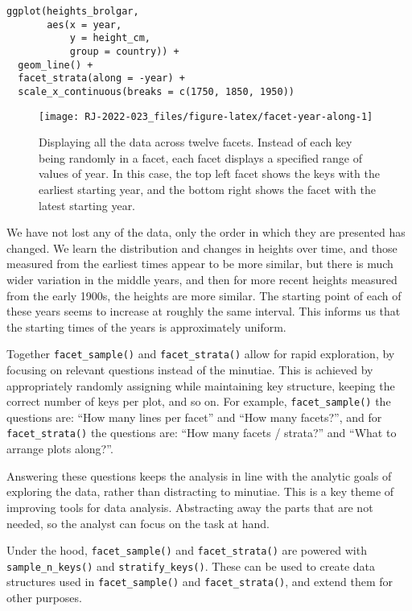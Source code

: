 \begin{verbatim}
ggplot(heights_brolgar,
       aes(x = year,
           y = height_cm,
           group = country)) + 
  geom_line() + 
  facet_strata(along = -year) + 
  scale_x_continuous(breaks = c(1750, 1850, 1950))
\end{verbatim}

\begin{figure}

{\centering \texttt{[image: RJ-2022-023\_files/figure-latex/facet-year-along-1]} 

}

\caption{Displaying all the data across twelve facets. Instead of each key being randomly in a facet, each facet displays a specified range of values of year. In this case, the top left facet shows the keys with the earliest starting year, and the bottom right shows the facet with the latest starting year.}\label{fig:facet-year-along}
\end{figure}

We have not lost any of the data, only the order in which they are presented has changed. We learn the distribution and changes in heights over time, and those measured from the earliest times appear to be more similar, but there is much wider variation in the middle years, and then for more recent heights measured from the early 1900s, the heights are more similar. The starting point of each of these years seems to increase at roughly the same interval. This informs us that the starting times of the years is approximately uniform.

Together \texttt{facet\_sample()} and \texttt{facet\_strata()} allow for rapid exploration, by focusing on relevant questions instead of the minutiae. This is achieved by appropriately randomly assigning while maintaining key structure, keeping the correct number of keys per plot, and so on. For example, \texttt{facet\_sample()} the questions are: ``How many lines per facet'' and ``How many facets?'', and for \texttt{facet\_strata()} the questions are: ``How many facets / strata?'' and ``What to arrange plots along?''.

Answering these questions keeps the analysis in line with the analytic goals of exploring the data, rather than distracting to minutiae. This is a key theme of improving tools for data analysis. Abstracting away the parts that are not needed, so the analyst can focus on the task at hand.

Under the hood, \texttt{facet\_sample()} and \texttt{facet\_strata()} are powered with \texttt{sample\_n\_keys()} and \texttt{stratify\_keys()}. These can be used to create data structures used in \texttt{facet\_sample()} and \texttt{facet\_strata()}, and extend them for other purposes.

